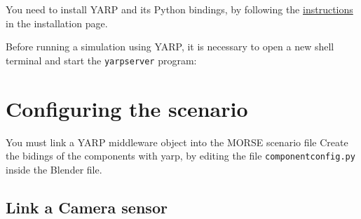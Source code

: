 \documentclass[twoside,a4paper,10pt]{report}
\newcommand{\dokutitleleveltwo}[1]{\section{#1}}
\newcommand{\dokutitleleveltree}[1]{\subsection{#1}}
\newcommand{\dokumonospace}[1]{\texttt{#1}}
\begin{document}
You need to install YARP and its Python bindings, by following the \hyperref[ec46d0b85077d7a7fe8da2e2b4c70462]{ instructions} in the installation page.

Before running a simulation using YARP, it is necessary to open a new shell terminal and start the \dokumonospace{yarpserver} program:


\small
{}
\normalsize

\dokutitleleveltwo{Configuring the scenario}
\label{a5eb0127854ee2548f6841c01cbaee73}%

You must link a YARP middleware object into the MORSE scenario file
Create the bidings of the components with yarp, by editing the file \dokumonospace{component{\textunderscore}config.py} inside the Blender file.


\dokutitleleveltree{Link a Camera sensor}
\label{2e2e4de5af03ad71dd248a06e314e9d7}%
\end{document}
